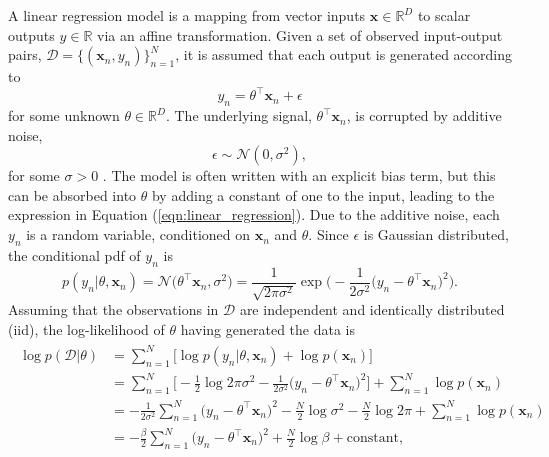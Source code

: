 \documentclass[msc,deptreport.inf]{infthesis} %
\newcommand{\matr}[1]{\mathbf{#1}}
\newcommand{\R}{\mathbb R}
\begin{document}
A linear regression model is a mapping from vector inputs $\matr{x} \in \R^D$ to scalar outputs $y \in \R$ via an affine transformation. Given a set of observed input-output pairs, $\mathcal{D} = \{(\matr{x}_n, y_n)\}_{n=1}^{N}$, it is assumed that each output is generated according to 
\begin{equation}\label{eqn:linear_regression}
	y_n = \theta^\intercal \matr{x}_n + \epsilon
\end{equation}
for some unknown $\theta \in \R^D$. The underlying signal, $\theta^\intercal \matr{x}_n$, is corrupted by additive noise, 
\begin{equation}
	\epsilon \sim \mathcal{N}(0, \sigma^2), 
\end{equation}
for some $\sigma > 0$ \cite{barber2007}. The model is often written with an explicit bias term, but this can be absorbed into $\theta$ by adding a constant of one to the input, leading to the expression in Equation (\ref{eqn:linear_regression}). Due to the additive noise, each $y_n$ is a random variable, conditioned on $\matr{x}_n$ and $\theta$. Since $\epsilon$ is Gaussian distributed, the conditional pdf of $y_n$ is 
\begin{equation}\label{eqn:linear_regression_pdf}
	p(y_n | \theta, \matr{x}_n) 
	= \mathcal{N}\big(\theta^\intercal \matr{x}_n, \sigma^2\big)
	= \frac{1}{\sqrt{2\pi \sigma^2}} \exp\Big(-\frac{1}{2\sigma^2} \big(y_n - \theta^\intercal \matr{x}_n \big)^2\Big).
\end{equation}
Assuming that the observations in $\mathcal{D}$ are independent and identically distributed (iid), the log-likelihood of $\theta$ having generated the data is 
\begin{align}\label{eqn:linear_regression_log_likelihood}
\begin{split}
	\log p(\mathcal{D} | \theta) 
	& = \sum_{n=1}^N \big[ \log p(y_n | \theta, \matr{x}_n)  + \log p(\matr{x}_n) \big] \\
	& = \sum_{n=1}^N \Big[ -\frac{1}{2} \log 2\pi \sigma^2 - \frac{1}{2\sigma^2} \big(y_n - \theta^\intercal \matr{x}_n \big)^2 \Big]
	+ \sum_{n=1}^N \log p(\matr{x}_n) \\
	& = - \frac{1}{2 \sigma^2} \sum_{n=1}^N \big(y_n - \theta^\intercal \matr{x}_n \big)^2 
	- \frac{N}{2} \log \sigma^2
	- \frac{N}{2} \log 2\pi
	+ \sum_{n=1}^N \log p(\matr{x}_n) \\
	& = - \frac{\beta}{2} \sum_{n=1}^N \big(y_n - \theta^\intercal \matr{x}_n \big)^2 
	+ \frac{N}{2} \log \beta
	+ \text{constant},
\end{split}
\end{align}
\end{document}

